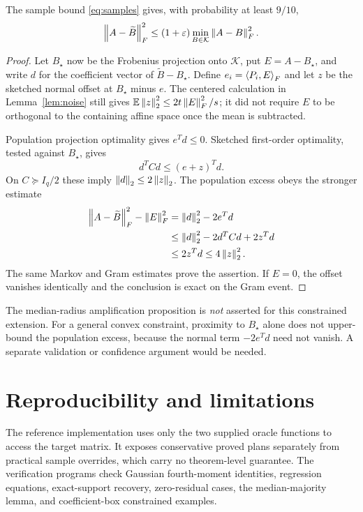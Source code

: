 \documentclass[11pt]{article}
\begin{document}
\begin{proposition}\label{prop:convex}
The sample bound \eqref{eq:samples} gives, with probability at least $9/10$,
\[
 \left\lVert A-\widetilde B\right\rVert_F^2\le(1+\varepsilon)
                  \min_{B\in\mathcal K}\left\lVert A-B\right\rVert_F^2.
\]
\end{proposition}
\begin{proof}
Let $B_\star$ now be the Frobenius projection onto $\mathcal K$, put $E=A-B_\star$, and write $d$ for the coefficient vector of $\widetilde B-B_\star$. Define $e_i=\left\langle P_i,E\right\rangle_F$ and let $z$ be the sketched normal offset at $B_\star$ minus $e$. The centered calculation in Lemma~\ref{lem:noise} still gives $\mathbb E\left\lVert z\right\rVert_2^2\le2t\left\lVert E\right\rVert_F^2/s$; it did not require $E$ to be orthogonal to the containing affine space once the mean is subtracted.

Population projection optimality gives $e^Td\le0$. Sketched first-order optimality, tested against $B_\star$, gives
\[
 d^TCd\le(e+z)^Td.
\]
On $C\succeq I_q/2$ these imply $\left\lVert d\right\rVert_2\le2\left\lVert z\right\rVert_2$. The population excess obeys the stronger estimate
\begin{align*}
 \left\lVert A-\widetilde B\right\rVert_F^2-\left\lVert E\right\rVert_F^2
 &=\left\lVert d\right\rVert_2^2-2e^Td\\
 &\le\left\lVert d\right\rVert_2^2-2d^TCd+2z^Td\\
 &\le2z^Td\le4\left\lVert z\right\rVert_2^2.
\end{align*}
The same Markov and Gram estimates prove the assertion. If $E=0$, the offset vanishes identically and the conclusion is exact on the Gram event.
\end{proof}

The median-radius amplification proposition is \emph{not} asserted for this constrained extension. For a general convex constraint, proximity to $B_\star$ alone does not upper-bound the population excess, because the normal term $-2e^Td$ need not vanish. A separate validation or confidence argument would be needed.

\section{Reproducibility and limitations}
The reference implementation uses only the two supplied oracle functions to access the target matrix. It exposes conservative proved plans separately from practical sample overrides, which carry no theorem-level guarantee. The verification programs check Gaussian fourth-moment identities, regression equations, exact-support recovery, zero-residual cases, the median-majority lemma, and coefficient-box constrained examples.
\end{document}
